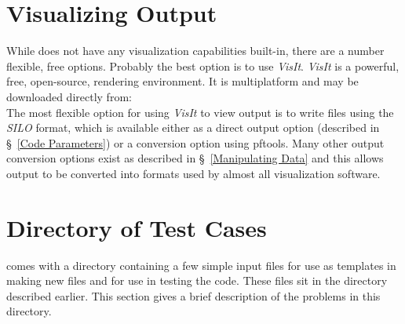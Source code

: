
\section{Visualizing Output}
\label{Visualizing Output}

While \parflow{} does not have any visualization capabilities built-in, there are a number
flexible, free options.  Probably the best option is to use \emph{VisIt}.
\emph{VisIt} is a powerful, free, open-source, rendering environment.  It is 
multiplatform and may be downloaded directly from:
  \\
The most flexible option for using \emph{VisIt} to view \parflow{} output is to write files using the \emph{SILO} format, which is available either as a direct output option (described in \S~\ref{Code Parameters}) or a conversion option using pftools.  Many other output conversion options exist as described in \S~\ref{Manipulating Data} and this allows \parflow{} output to be converted into formats used by almost all visualization software.

\section{Directory of Test Cases}
\label{Test Directory}

\parflow{} comes with a directory containing a few simple input files for use
as templates in making new files and for use in testing the code.  These files sit in the  directory described earlier. This section gives a brief description of the problems in this directory.

